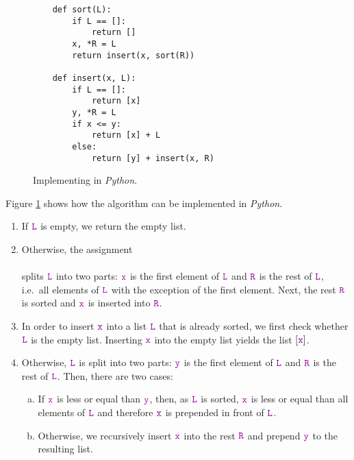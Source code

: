 \begin{figure}[!ht]
  \centering
\begin{verbatim}
    def sort(L):
        if L == []:
            return []
        x, *R = L
        return insert(x, sort(R))
        
    def insert(x, L):
        if L == []:
            return [x]
        y, *R = L
        if x <= y:
            return [x] + L
        else:
            return [y] + insert(x, R)
\end{verbatim}
\vspace*{-0.3cm}
  \caption{Implementing  in \textsl{Python}.}
  \label{fig:Insertion-Sort.ipynb}
\end{figure} 

\noindent
Figure \ref{fig:Insertion-Sort.ipynb} shows how the  algorithm can be implemented 
in \textsl{Python}.
\begin{enumerate}
\item If $\mytt{L}$ is empty, we return the empty list.
\item Otherwise, the assignment
      \\[0.2cm]
      \hspace*{1.3cm}
      \\[0.2cm]
      splits $\mytt{L}$ into two parts: $\mytt{x}$ is the first element of $\mytt{L}$ and $\mytt{R}$ is the rest of $\mytt{L}$,
      i.e.~all elements of $\mytt{L}$ with the exception of the first element.  Next, the rest $\mytt{R}$
      is sorted and $\mytt{x}$ is inserted into $\mytt{R}$.
\item In order to insert $\mytt{x}$ into a list $\mytt{L}$ that is already sorted, we first check whether
      $\mytt{L}$ is the empty list.  Inserting $\mytt{x}$ into the empty list yields the list $[\mytt{x}]$.
\item Otherwise, $\mytt{L}$ is split into two parts: $\mytt{y}$ is the first element of $\mytt{L}$ and
      $\mytt{R}$ is the rest of $\mytt{L}$. 
      Then, there are two cases:
      \begin{enumerate}[(a)]
      \item If $\mytt{x}$ is less or equal than $\mytt{y}$, then, as $\mytt{L}$ is sorted,  $\mytt{x}$
            is less or equal than all elements of $\mytt{L}$ and therefore $\mytt{x}$ is prepended in front
            of $\mytt{L}$. 
      \item Otherwise, we recursively insert $\mytt{x}$ into the rest $\mytt{R}$ and prepend $\mytt{y}$
            to the resulting list.     
      \end{enumerate}
\end{enumerate}

